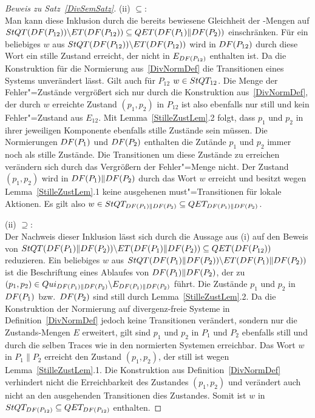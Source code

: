 \begin{proof}[Beweis zu Satz~\ref{DivSemSatz}]
  (ii) \glqq $\subseteq$\grqq:\\
  Man kann diese Inklusion durch die bereits bewiesene Gleichheit der
  \ET{}-Mengen auf $StQT (DF (P_{12})) \backslash ET (DF (P_{12}))
  \subseteq QET (DF (P_1)\|DF (P_2))$ einschränken. Für ein beliebiges $w$
  aus $StQT (DF (P_{12})) \backslash ET (DF (P_{12}))$ wird in $DF
  (P_{12})$ durch diese Wort ein stille Zustand erreicht, der nicht in $E_{DF
  (P_{12})}$ enthalten ist. Da die Konstruktion für die Normierung
  aus~\ref{DivNormDef} die Transitionen eines Systems unverändert lässt. Gilt
  auch für $P_{12}$ $w\in StQT _{12}$. Die Menge der Fehler"=Zustände
  vergrößert sich nur durch die Konstruktion aus~\ref{DivNormDef}, der durch
  $w$ erreichte Zustand $(p_1,p_2)$ in $P_{12}$ ist also ebenfalls nur still
  und kein Fehler"=Zustand aus $E_{12}$. Mit Lemma~\ref{StilleZustLem}.2 folgt,
  dass $p_1$ und $p_2$ in ihrer jeweiligen Komponente ebenfalls stille Zustände
  sein müssen. Die Normierungen $DF (P_1)$ und $DF (P_2)$ enthalten die
  Zutände $p_1$ und $p_2$ immer noch als stille Zustände. Die Transitionen um
  diese Zustände zu erreichen verändern sich durch das Vergrößern der
  Fehler"=Menge nicht. Der Zustand $(p_1,p_2)$ wird in $DF (P_1)\|DF (P_2)$
  durch das Wort $w$ erreicht und besitzt wegen Lemma~\ref{StilleZustLem}.1
  keine ausgehenen must"=Transitionen für lokale Aktionen. Es gilt also $w\in
  StQT _{DF (P_1)\|DF (P_2)}\subseteq QET _{DF (P_1)\|DF (P_2)}$.

  (ii) \glqq $\supseteq$\grqq:\\
  Der Nachweis dieser Inklusion lässt sich durch die Aussage aus (i) auf den
  Beweis von $StQT (DF (P_1)\|DF (P_2)) \backslash ET (DF (P_1)\|DF
  (P_2)) \subseteq QET (DF (P_{12}))$ reduzieren. Ein beliebiges $w$ aus
  $StQT (DF (P_1)\|DF (P_2)) \backslash ET (DF (P_1)\|DF (P_2))$ ist die
  Beschriftung eines Ablaufes von $DF (P_1)\|DF (P_2)$, der zu $(p_1,p_2)\in
  Qui _{DF (P_1)\|DF (P_2)}\backslash E_{DF (P_1)\|DF (P_2)}$ führt. Die
  Zustände $p_1$ und $p_2$ in $DF (P_1)$ bzw.\ $DF (P_2)$ sind still durch
  Lemma~\ref{StilleZustLem}.2. Da die Konstruktion der Normierung auf
  divergenz-freie Systeme in Definition~\ref{DivNormDef} jedoch keine
  Transitionen verändert, sondern nur die Zustands-Mengen $E$ erweitert, gilt
  sind $p_1$ und $p_2$ in $P_1$ und $P_2$ ebenfalls still und durch die selben
  Traces wie in den normierten Systemen erreichbar. Das Wort $w$ in $P_1\|P_2$
  erreicht den Zustand $(p_1,p_2)$, der still ist wegen
  Lemma~\ref{StilleZustLem}.1. Die Konstruktion aus Definition~\ref{DivNormDef}
  verhindert nicht die Erreichbarkeit des Zustandes $(p_1,p_2)$ und verändert
  auch nicht an den ausgehenden Transitionen dies Zustandes. Somit ist $w$ in
  $StQT _{DF (P_{12})}\subseteq QET _{DF (P_{12})}$ enthalten.


\end{proof}
